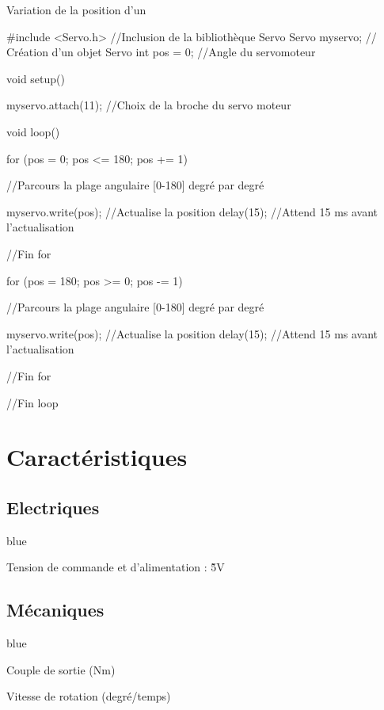 \begin{Cpp}{Variation de la position d'un \servo}

  #include <Servo.h>      //Inclusion de la bibliothèque Servo
  Servo myservo;  // Création d'un objet Servo
  int pos = 0;    //Angle du servomoteur
  
  void setup() {

    myservo.attach(11);  //Choix de la broche du servo moteur

  }
  
  void loop() {

    for (pos = 0; pos <= 180; pos += 1) { //Parcours la plage angulaire [0-180] degré par degré

      myservo.write(pos);              //Actualise la position 
      delay(15);                       //Attend 15 ms avant l'actualisation

    }//Fin for

    for (pos = 180; pos >= 0; pos -= 1) {     //Parcours la plage angulaire [0-180] degré par degré

      myservo.write(pos);              //Actualise la position 
      delay(15);                       //Attend 15 ms avant l'actualisation

    }//Fin for
  }//Fin loop

\end{Cpp}


\section{Caractéristiques}


\subsection{Electriques}


\begin{items}{blue}{\Bullet}
  \item Tension de commande et d'alimentation : \~5V
\end{items}

\subsection{Mécaniques}

\begin{items}{blue}{\Bullet}
  \item Couple de sortie (Nm)
  \item Vitesse de rotation (degré/temps)
\end{items}
